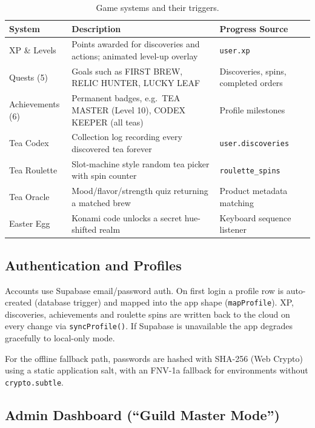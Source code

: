 \documentclass[11pt,a4paper]{article}
\begin{document}
\begin{table}[h!]
\centering
\caption{Game systems and their triggers.}
\begin{tabular}{@{}p{3.4cm}p{5.6cm}p{5.6cm}@{}}
\toprule
\textbf{System} & \textbf{Description} & \textbf{Progress Source} \\
\midrule
XP \& Levels    & Points awarded for discoveries and actions; animated level-up overlay & \texttt{user.xp} \\
Quests (5)      & Goals such as FIRST BREW, RELIC HUNTER, LUCKY LEAF & Discoveries, spins, completed orders \\
Achievements (6)& Permanent badges, e.g.\ TEA MASTER (Level 10), CODEX KEEPER (all teas) & Profile milestones \\
Tea Codex       & Collection log recording every discovered tea forever & \texttt{user.discoveries} \\
Tea Roulette    & Slot-machine style random tea picker with spin counter & \texttt{roulette\_spins} \\
Tea Oracle      & Mood/flavor/strength quiz returning a matched brew & Product metadata matching \\
Easter Egg      & Konami code unlocks a secret hue-shifted realm & Keyboard sequence listener \\
\bottomrule
\end{tabular}
\end{table}

\subsection{Authentication and Profiles}

Accounts use Supabase email/password auth. On first login a profile row is
auto-created (database trigger) and mapped into the app shape
(\texttt{mapProfile}). XP, discoveries, achievements and roulette spins are
written back to the cloud on every change via \texttt{syncProfile()}. If
Supabase is unavailable the app degrades gracefully to local-only mode.

For the offline fallback path, passwords are hashed with SHA-256
(Web Crypto) using a static application salt, with an FNV-1a fallback for
environments without \texttt{crypto.subtle}.

\subsection{Admin Dashboard (``Guild Master Mode'')}
\end{document}
